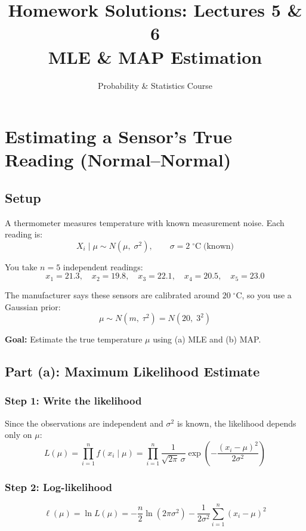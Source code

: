 \documentclass[11pt]{article}
\title{Homework Solutions: Lectures 5 \& 6\\[4pt]
\large MLE \& MAP Estimation}
\author{Probability \& Statistics Course}
\date{}
\begin{document}
\maketitle

\section*{Estimating a Sensor's True Reading (Normal--Normal)}

\subsection*{Setup}

A thermometer measures temperature with known measurement noise. Each reading is:
\[
  X_i \mid \mu \sim N(\mu,\; \sigma^2), \qquad \sigma = 2\;{}^\circ\text{C} \;\text{(known)}
\]

You take $n = 5$ independent readings:
\[
  x_1 = 21.3, \quad x_2 = 19.8, \quad x_3 = 22.1, \quad x_4 = 20.5, \quad x_5 = 23.0
\]

The manufacturer says these sensors are calibrated around $20\;{}^\circ\text{C}$, so you use a Gaussian prior:
\[
  \mu \sim N(m,\; \tau^2) = N(20,\; 3^2)
\]

\textbf{Goal:} Estimate the true temperature $\mu$ using (a) MLE and (b) MAP.

\subsection*{Part (a): Maximum Likelihood Estimate}

\subsubsection*{Step 1: Write the likelihood}

Since the observations are independent and $\sigma^2$ is known, the likelihood depends only on $\mu$:
\[
  L(\mu) = \prod_{i=1}^n f(x_i \mid \mu) = \prod_{i=1}^n \frac{1}{\sqrt{2\pi}\,\sigma} \exp\!\left(-\frac{(x_i - \mu)^2}{2\sigma^2}\right)
\]

\subsubsection*{Step 2: Log-likelihood}
\[
  \ell(\mu) = \ln L(\mu) = -\frac{n}{2}\ln(2\pi\sigma^2) - \frac{1}{2\sigma^2}\sum_{i=1}^n (x_i - \mu)^2
\]
\end{document}
